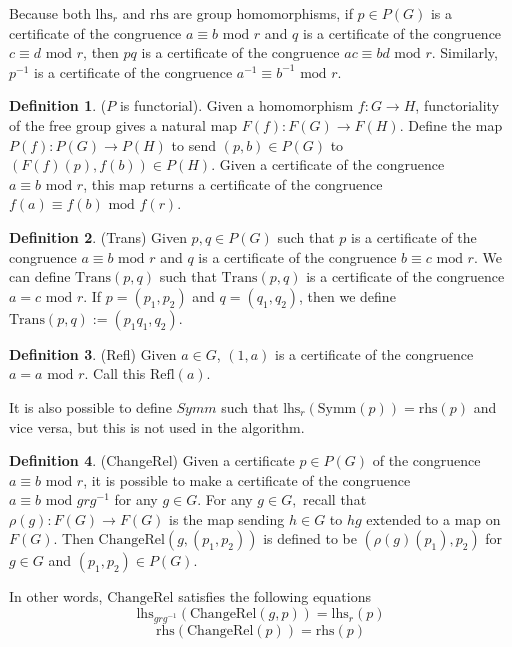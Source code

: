 \documentclass[12pt]{article} %
\theoremstyle{definition}
\theoremstyle{definition}
\theoremstyle{definition}
\theoremstyle{definition}
\theoremstyle{definition}
\theoremstyle{definition}
\newtheorem{subdef}{Definition}[theorem]
\begin{document}
Because both $\text{lhs}_r$ and $\text{rhs}$ are group homomorphisms, if $p \in P(G)$ is a certificate
of the congruence $a \equiv b \text{ mod } r$ and $q$ is a certificate of the congruence
$c \equiv d \text{ mod } r$, then $pq$ is a certificate of the congruence $ac \equiv bd \text{ mod } r$.
Similarly, $p^{-1}$ is a certificate of the congruence $a^{-1} \equiv b^{-1} \text{ mod } r$.

\begin{subdef}($P$ is functorial).
  Given a homomorphism $f: G \to H$,
  functoriality of the free group gives a natural map $F(f): F(G) \to F(H)$.
  Define the map $P(f): P(G) \to P(H)$ to send $(p, b) \in P(G)$ to $(F(f)(p), f(b)) \in P(H)$.
  Given a certificate of the congruence $a \equiv b \text{ mod } r$, this map returns
  a certificate of the congruence $f(a) \equiv f(b) \text{ mod } f(r)$.
\end{subdef}

\begin{subdef}(Trans)
  Given $p,q \in P(G)$ such that $p$ is a certificate of the congruence $a \equiv b \text{ mod } r$
  and $q$ is a certificate of the congruence $b \equiv c \text{ mod } r$. We can define
  $\text{Trans}(p,q)$ such that $\text{Trans}(p,q)$ is a certificate of the congruence
  $a = c \text{ mod } r$.
  If $p = (p_1, p_2)$ and $q = (q_1, q_2)$, then we define $\text{Trans}(p,q) := (p_1q_1, q_2)$.
\end{subdef}

\begin{subdef}(Refl)
  Given $a \in G$, $(1, a)$ is a certificate of the congruence $a = a \text{ mod } r$. Call
  this $\text{Refl}(a)$.
\end{subdef}

It is also possible to define $\textit{Symm}$ such that $\text{lhs}_r(\text{Symm}(p)) = \text{rhs}(p)$
and vice versa, but this is not used in the algorithm.

\begin{subdef}(ChangeRel)
  Given a certificate $p \in P(G)$ of the congruence $a \equiv b \text{ mod } r$, it is possible
  to make a certificate of the congruence $a \equiv b \text{ mod } g r g^{-1}$ for any $g \in G$.
  For any $g \in G,$ recall that $\rho(g): F(G) \to F(G)$ is the map sending $h \in G$ to
  $hg$ extended to a map on $F(G)$.
  Then $\text{ChangeRel}(g,(p_1,p_2))$ is defined to be $(\rho(g)(p_1), p_2)$ for
  $g \in G$ and $(p_1, p_2) \in P(G)$.

  In other words, $\text{ChangeRel}$ satisfies the following equations
  \begin{equation}
    \text{lhs}_{grg^{-1}}\left(\text{ChangeRel}(g, p)\right) = \text{lhs}_r(p)
  \end{equation}
  \begin{equation}
    \text{rhs}(\text{ChangeRel}(p)) = \text{rhs}(p)
  \end{equation}
\end{subdef}
\end{document}

